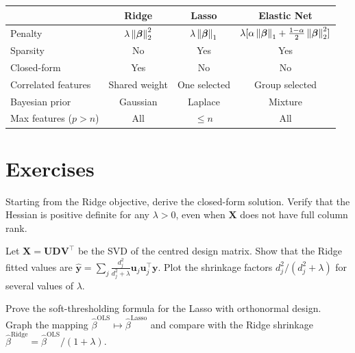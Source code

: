 \begin{keyformulas}[title=\textbf{Ridge vs.\ Lasso vs.\ Elastic Net}]
\renewcommand{\arraystretch}{1.4}
\begin{tabular}{lccc}
\toprule
& \textbf{Ridge} & \textbf{Lasso} & \textbf{Elastic Net} \\
\midrule
Penalty & $\lambda\left\| \bm{\beta} \right\|_2^2$ & $\lambda\left\| \bm{\beta} \right\|_1$ & $\lambda[\alpha\left\| \bm{\beta} \right\|_1 + \frac{1-\alpha}{2}\left\| \bm{\beta} \right\|_2^2]$ \\
Sparsity & No & Yes & Yes \\
Closed-form & Yes & No & No \\
Correlated features & Shared weight & One selected & Group selected \\
Bayesian prior & Gaussian & Laplace & Mixture \\
Max features ($p>n$) & All & $\leq n$ & All \\
\bottomrule
\end{tabular}
\end{keyformulas}

\section{Exercises}

\begin{exercise}
Starting from the Ridge objective, derive the closed-form solution. Verify that the Hessian is positive definite for any $\lambda > 0$, even when $\bm{X}$ does not have full column rank.
\end{exercise}

\begin{exercise}
Let $\bm{X} = \bm{U}\bm{D}\bm{V}^\top$ be the SVD of the centred design matrix. Show that the Ridge fitted values are $\hat{\bm{y}} = \sum_j \frac{d_j^2}{d_j^2+\lambda}\bm{u}_j\bm{u}_j^\top\bm{y}$. Plot the shrinkage factors $d_j^2/(d_j^2+\lambda)$ for several values of $\lambda$.
\end{exercise}

\begin{exercise}
Prove the soft-thresholding formula for the Lasso with orthonormal design. Graph the mapping $\hat{\beta}^{\text{OLS}} \mapsto \hat{\beta}^{\text{Lasso}}$ and compare with the Ridge shrinkage $\hat{\beta}^{\text{Ridge}} = \hat{\beta}^{\text{OLS}}/(1+\lambda)$.
\end{exercise}

